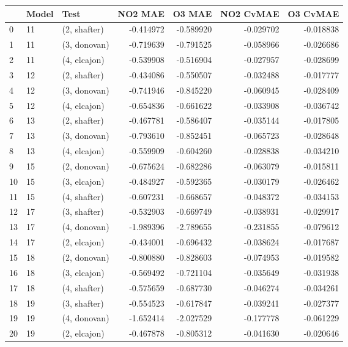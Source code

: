 \begin{tabular}{lllrrrr}
\toprule
{} & Model &          Test &   NO2 MAE &    O3 MAE &  NO2 CvMAE &  O3 CvMAE \\
\midrule
0  &    11 &  (2, shafter) & -0.414972 & -0.589920 &  -0.029702 & -0.018838 \\
1  &    11 &  (3, donovan) & -0.719639 & -0.791525 &  -0.058966 & -0.026686 \\
2  &    11 &  (4, elcajon) & -0.539908 & -0.516904 &  -0.027957 & -0.028699 \\
3  &    12 &  (2, shafter) & -0.434086 & -0.550507 &  -0.032488 & -0.017777 \\
4  &    12 &  (3, donovan) & -0.741946 & -0.845220 &  -0.060945 & -0.028409 \\
5  &    12 &  (4, elcajon) & -0.654836 & -0.661622 &  -0.033908 & -0.036742 \\
6  &    13 &  (2, shafter) & -0.467781 & -0.586407 &  -0.035144 & -0.017805 \\
7  &    13 &  (3, donovan) & -0.793610 & -0.852451 &  -0.065723 & -0.028648 \\
8  &    13 &  (4, elcajon) & -0.559909 & -0.604260 &  -0.028838 & -0.034210 \\
9  &    15 &  (2, donovan) & -0.675624 & -0.682286 &  -0.063079 & -0.015811 \\
10 &    15 &  (3, elcajon) & -0.484927 & -0.592365 &  -0.030179 & -0.026462 \\
11 &    15 &  (4, shafter) & -0.607231 & -0.668657 &  -0.048372 & -0.034153 \\
12 &    17 &  (3, shafter) & -0.532903 & -0.669749 &  -0.038931 & -0.029917 \\
13 &    17 &  (4, donovan) & -1.989396 & -2.789655 &  -0.231855 & -0.079612 \\
14 &    17 &  (2, elcajon) & -0.434001 & -0.696432 &  -0.038624 & -0.017687 \\
15 &    18 &  (2, donovan) & -0.800880 & -0.828603 &  -0.074953 & -0.019582 \\
16 &    18 &  (3, elcajon) & -0.569492 & -0.721104 &  -0.035649 & -0.031938 \\
17 &    18 &  (4, shafter) & -0.575659 & -0.687730 &  -0.046274 & -0.034261 \\
18 &    19 &  (3, shafter) & -0.554523 & -0.617847 &  -0.039241 & -0.027377 \\
19 &    19 &  (4, donovan) & -1.652414 & -2.027529 &  -0.177778 & -0.061229 \\
20 &    19 &  (2, elcajon) & -0.467878 & -0.805312 &  -0.041630 & -0.020646 \\

\end{tabular}
